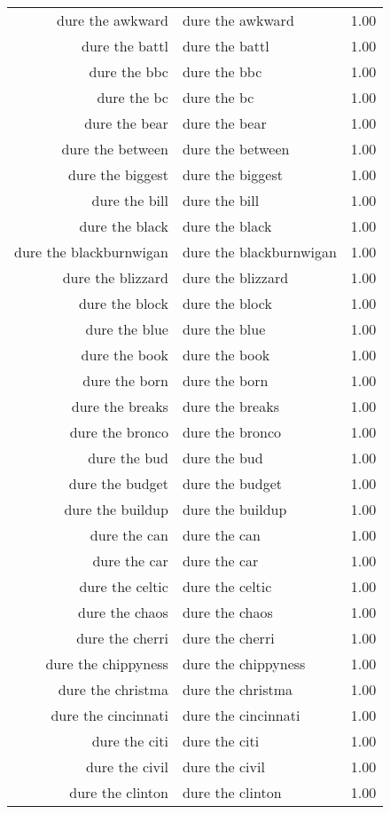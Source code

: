 \begin{table}[ht]
\begin{tabular}{rlr}
  dure the awkward & dure the awkward & 1.00 \\ 
  dure the battl & dure the battl & 1.00 \\ 
  dure the bbc & dure the bbc & 1.00 \\ 
  dure the bc & dure the bc & 1.00 \\ 
  dure the bear & dure the bear & 1.00 \\ 
  dure the between & dure the between & 1.00 \\ 
  dure the biggest & dure the biggest & 1.00 \\ 
  dure the bill & dure the bill & 1.00 \\ 
  dure the black & dure the black & 1.00 \\ 
  dure the blackburnwigan & dure the blackburnwigan & 1.00 \\ 
  dure the blizzard & dure the blizzard & 1.00 \\ 
  dure the block & dure the block & 1.00 \\ 
  dure the blue & dure the blue & 1.00 \\ 
  dure the book & dure the book & 1.00 \\ 
  dure the born & dure the born & 1.00 \\ 
  dure the breaks & dure the breaks & 1.00 \\ 
  dure the bronco & dure the bronco & 1.00 \\ 
  dure the bud & dure the bud & 1.00 \\ 
  dure the budget & dure the budget & 1.00 \\ 
  dure the buildup & dure the buildup & 1.00 \\ 
  dure the can & dure the can & 1.00 \\ 
  dure the car & dure the car & 1.00 \\ 
  dure the celtic & dure the celtic & 1.00 \\ 
  dure the chaos & dure the chaos & 1.00 \\ 
  dure the cherri & dure the cherri & 1.00 \\ 
  dure the chippyness & dure the chippyness & 1.00 \\ 
  dure the christma & dure the christma & 1.00 \\ 
  dure the cincinnati & dure the cincinnati & 1.00 \\ 
  dure the citi & dure the citi & 1.00 \\ 
  dure the civil & dure the civil & 1.00 \\ 
  dure the clinton & dure the clinton & 1.00 \\ 

\end{tabular}
\end{table}
